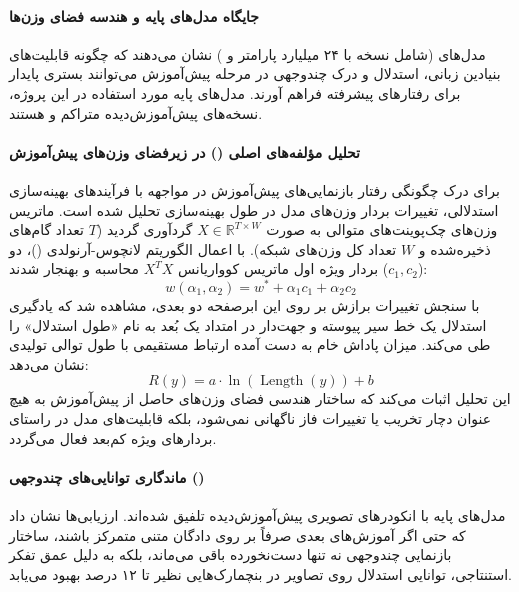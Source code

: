 \item {}

\paragraph*{جایگاه مدل‌های پایه و هندسه فضای وزن‌ها}
مدل‌های  \cite{magistral_2025} (شامل نسخه  با ۲۴ میلیارد پارامتر و ) نشان می‌دهند که چگونه قابلیت‌های بنیادین زبانی، استدلال و درک چندوجهی در مرحله پیش‌آموزش می‌توانند بستری پایدار برای رفتارهای پیشرفته فراهم آورند. مدل‌های پایه مورد استفاده در این پروژه، نسخه‌های پیش‌آموزش‌دیده متراکم  و  هستند.

\paragraph*{تحلیل مؤلفه‌های اصلی () در زیرفضای وزن‌های پیش‌آموزش}
برای درک چگونگی رفتار بازنمایی‌های پیش‌آموزش در مواجهه با فرآیندهای بهینه‌سازی استدلالی، تغییرات بردار وزن‌های مدل در طول بهینه‌سازی تحلیل شده است. ماتریس وزن‌های چک‌پوینت‌های متوالی به صورت $X \in \mathbb{R}^{T \times W}$ گردآوری گردید ($T$ تعداد گام‌های ذخیره‌شده و $W$ تعداد کل وزن‌های شبکه). با اعمال الگوریتم لانچوس-آرنولدی ()، دو بردار ویژه اول ماتریس کوواریانس $X^T X$ محاسبه و بهنجار شدند ($c_1, c_2$):
\begin{equation}
    w(\alpha_1, \alpha_2) = w^* + \alpha_1 c_1 + \alpha_2 c_2
\end{equation}
با سنجش تغییرات برازش بر روی این ابرصفحه دو بعدی، مشاهده شد که یادگیری استدلال یک خط سیر پیوسته و جهت‌دار در امتداد یک بُعد به نام «طول استدلال» را طی می‌کند. میزان پاداش خام به دست آمده ارتباط مستقیمی با طول توالی تولیدی نشان می‌دهد:
\begin{equation}
    R(y) = a \cdot \ln(\operatorname{Length}(y)) + b
\end{equation}
این تحلیل اثبات می‌کند که ساختار هندسی فضای وزن‌های حاصل از پیش‌آموزش به هیچ عنوان دچار تخریب یا تغییرات فاز ناگهانی نمی‌شود، بلکه قابلیت‌های مدل در راستای بردارهای ویژه کم‌بعد فعال می‌گردد.

\paragraph*{ماندگاری توانایی‌های چندوجهی ()}
مدل‌های پایه با انکودرهای تصویری پیش‌آموزش‌دیده تلفیق شده‌اند. ارزیابی‌ها نشان داد که حتی اگر آموزش‌های بعدی صرفاً بر روی دادگان متنی متمرکز باشند، ساختار بازنمایی چندوجهی نه تنها دست‌نخورده باقی می‌ماند، بلکه به دلیل عمق تفکر استنتاجی، توانایی استدلال روی تصاویر در بنچمارک‌هایی نظیر  تا ۱۲ درصد بهبود می‌یابد.